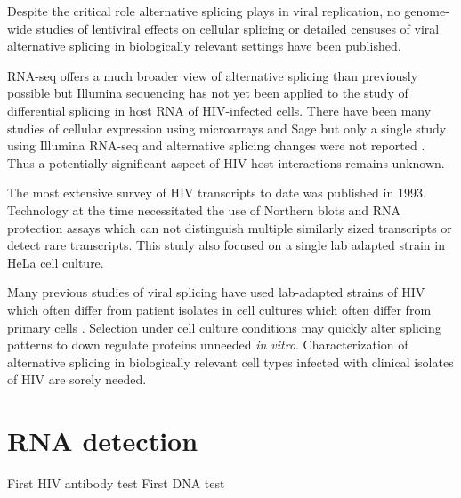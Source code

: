 \documentclass[../sherrill-Mix_thesis.tex]{subfiles}
\begin{document}
	Despite the critical role alternative splicing plays in viral replication, no genome-wide studies of lentiviral effects on cellular splicing or  detailed censuses of viral alternative splicing in biologically relevant settings have been published.

	RNA-seq offers a much broader view of alternative splicing than previously possible \citep{Trapnell2010,Rogers2012} but Illumina sequencing has not yet been applied to the study of differential splicing in host RNA of HIV-infected cells. There have been many studies of cellular expression using microarrays \citep{Vahey2002,Wout2003,Mitchell2003,Rotger2010,Miller2011} and Sage \citep{Ryo1999,Lefebvre2011} but only a single study using Illumina RNA-seq and alternative splicing changes were not reported \citep{Chang2011}. Thus a potentially significant aspect of HIV-host interactions remains unknown.

	The most extensive survey of HIV transcripts to date was published in 1993\citep{Purcell1993}. Technology at the time necessitated the use of Northern blots and RNA protection assays \citep{Purcell1993} which can not distinguish multiple similarly sized transcripts or detect rare transcripts. This study also focused on a single lab adapted \hivNL{} strain in HeLa cell culture.

	Many previous studies of viral splicing have used lab-adapted strains of HIV which often differ from patient isolates \citep{Fujita1992} in cell cultures which often differ from primary cells \citep{McAllister1971}. Selection under cell culture conditions may quickly alter splicing patterns to down regulate proteins unneeded \emph{in vitro}.  Characterization of alternative splicing in biologically relevant cell types infected with clinical isolates of HIV are sorely needed.


\section{RNA detection}
	First HIV antibody test \citep{Safai1984,Sarngadharan1984} First DNA test \citep{Ou1988}
\end{document}
